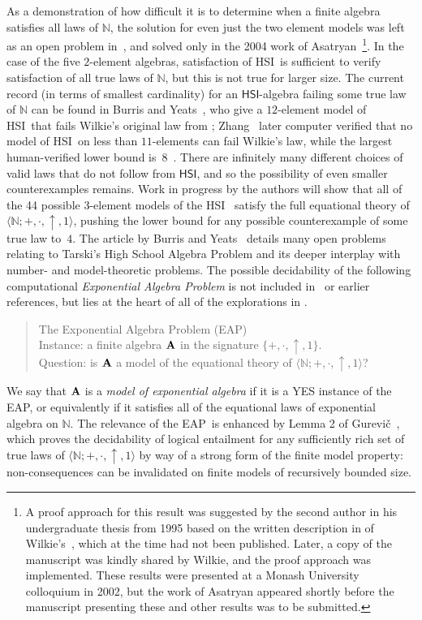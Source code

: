 \documentclass[eqnor,reqno]{amsart}
\theoremstyle{plain}
\theoremstyle{definition}
\newcommand{\HSI}{\textsf{HSI}}
\newcommand{\EAP}{\textsf{EAP}}
\begin{document}
As a demonstration of how difficult it is to determine when a finite algebra satisfies all laws of $\mathbb{N}$, the solution for even just the two element models was left as an open problem in~\cite{burlee92}, and solved only in the 2004 work of 
Asatryan~\cite{asa}\footnote{A proof approach for this result was suggested by the second author in his undergraduate thesis from 1995 based on the written description in \cite{burlee92} of Wilkie's~\cite{wil03}, which at the time had not been published.  
Later, a copy of the manuscript was kindly shared by Wilkie, and the proof approach was implemented.  
These results were presented at a Monash University colloquium in 2002, but the work of Asatryan \cite{asa} appeared shortly before the manuscript presenting these and other results was to be submitted.}.  
In the case of the five $2$-element algebras, satisfaction of \HSI\ is sufficient to verify satisfaction of all true laws of $\mathbb{N}$, but this is not true for larger size.  
The current record (in terms of smallest cardinality) for an $\HSI$-algebra failing some true law of $\mathbb{N}$ can be found in Burris and Yeats~\cite{buryea}, who give a $12$-element model of \HSI\ that fails Wilkie's original law from \cite{wil03}; Zhang~\cite{zha} later computer verified that no model of \HSI\ on less than $11$-elements can fail Wilkie's law, while the largest human-verified lower bound is~$8$~\cite{jac96}.  There are infinitely many different choices of valid laws that do not follow from $\HSI$, and so the possibility of even smaller counterexamples remains.  Work in progress by the authors will show that all of the 44 possible $3$-element models of the \HSI~\cite{burlee92} satisfy the full equational theory of $\langle \mathbb{N};+,\cdot,\uparrow,1\rangle$, pushing the lower bound for any possible counterexample of some true law to~$4$.
The article by Burris and Yeats~\cite{buryea} details many open problems relating to Tarski's High School Algebra Problem and its deeper interplay with number- and model-theoretic problems.  
The possible decidability of the following computational \emph{Exponential Algebra Problem} is not included in~\cite{buryea} or earlier references, but lies at the heart of all of the explorations in \cite{asa,burlee92,buryea,jac96}.
\begin{quotation}
\noindent\textsf{The Exponential Algebra Problem (EAP)}\\
\textsf{Instance:} a finite algebra ${\bf A}$ in the signature $\{+,\cdot,\uparrow,1\}$.\\
\textsf{Question:}  is ${\bf A}$ a model of the equational theory of $\langle \mathbb{N};+,\cdot,\uparrow,1\rangle$?
\end{quotation}
We say that ${\bf A}$ is a \emph{model of exponential algebra} if it is a YES instance of the \EAP, or equivalently if it satisfies all of the equational laws of exponential algebra on $\mathbb{N}$.
The relevance of the \EAP\ is enhanced by Lemma 2 of Gurevi\v{c}~\cite{gur85}, 
which proves the decidability of logical entailment for any sufficiently rich set of true laws of $\langle \mathbb{N};+,\cdot,\uparrow,1\rangle$ by way of a strong form of the finite model property: non-consequences can be invalidated on finite models of recursively bounded size.  
\end{document}
